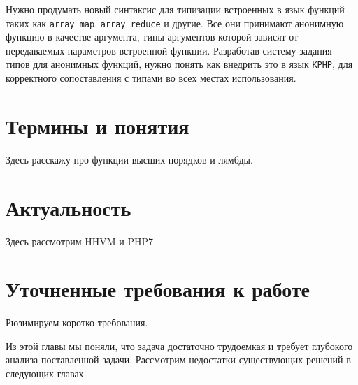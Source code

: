 Нужно продумать новый синтаксис для типизации встроенных в язык функций таких как \verb|array_map|, \verb|array_reduce| и другие. Все они принимают анонимную функцию в качестве аргумента, типы аргументов которой зависят от передаваемых параметров встроенной функции. Разработав систему задания типов для анонимных функций, нужно понять как внедрить это в язык \verb|KPHP|, для корректного сопоставления с типами во всех местах использования.

\section{Термины и понятия}
Здесь расскажу про функции высших порядков и лямбды.

\section{Актуальность}
Здесь рассмотрим HHVM и PHP7

\section{Уточненные требования к работе}
Рюзимируем коротко требования.

\chapterconclusion
Из этой главы мы поняли, что задача достаточно трудоемкая и требует глубокого анализа поставленной задачи.
Рассмотрим недостатки существующих решений в следующих главах.



